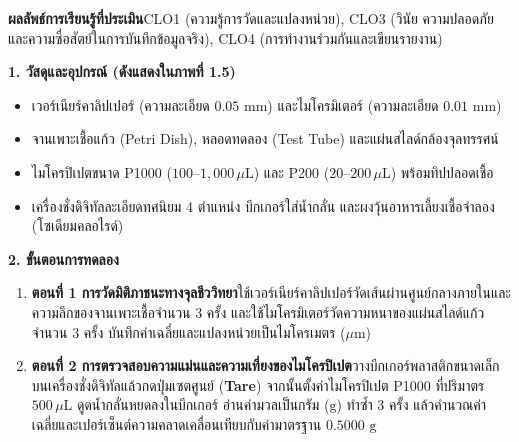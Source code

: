 \begin{labbox}
\noindent\textbf{ผลลัพธ์การเรียนรู้ที่ประเมิน}\quad CLO1 (ความรู้การวัดและแปลงหน่วย), CLO3 (วินัย ความปลอดภัย และความซื่อสัตย์ในการบันทึกข้อมูลจริง), CLO4 (การทำงานร่วมกันและเขียนรายงาน)

\vspace{4pt}
\noindent\textbf{1. วัสดุและอุปกรณ์ (ดังแสดงใน\mbox{ภาพที่} 1.5)}
\begin{itemize}
    \item เวอร์เนียร์คาลิปเปอร์ (ความละเอียด $0.05\text{ mm}$) และไมโครมิเตอร์ (ความละเอียด $0.01\text{ mm}$)
    \item จานเพาะเชื้อแก้ว (Petri Dish), หลอดทดลอง (Test Tube) และแผ่นสไลด์กล้องจุลทรรศน์
    \item ไมโครปิเปตขนาด P1000 ($100\text{--}1{,}000\,\mu\text{L}$) และ P200 ($20\text{--}200\,\mu\text{L}$) พร้อมทิปปลอดเชื้อ
    \item เครื่องชั่งดิจิทัลละเอียดทศนิยม 4 ตำแหน่ง บีกเกอร์ใส่น้ำกลั่น และผงวุ้นอาหารเลี้ยงเชื้อจำลอง (โซเดียมคลอไรด์)
\end{itemize}

\noindent\textbf{2. ขั้นตอนการทดลอง}
\begin{enumerate}
    \item \textbf{ตอนที่ 1 การวัดมิติภาชนะทางจุลชีววิทยา}\quad ใช้เวอร์เนียร์คาลิปเปอร์วัดเส้นผ่านศูนย์กลางภายในและความลึกของจานเพาะเชื้อจำนวน 3 ครั้ง และใช้ไมโครมิเตอร์วัดความหนาของแผ่นสไลด์แก้วจำนวน 3 ครั้ง บันทึกค่าเฉลี่ยและแปลงหน่วยเป็นไมโครเมตร ($\mu\text{m}$)
    \item \textbf{ตอนที่ 2 การตรวจสอบความแม่นและความเที่ยงของไมโครปิเปต}\quad วางบีกเกอร์พลาสติกขนาดเล็กบนเครื่องชั่งดิจิทัลแล้วกดปุ่มเซตศูนย์ (\textbf{Tare}) จากนั้นตั้งค่าไมโครปิเปต P1000 ที่ปริมาตร $500\,\mu\text{L}$ ดูดน้ำกลั่นหยดลงในบีกเกอร์ อ่านค่ามวลเป็นกรัม ($\text{g}$) ทำซ้ำ 3 ครั้ง แล้วคำนวณค่าเฉลี่ยและเปอร์เซ็นต์ความคลาดเคลื่อนเทียบกับค่ามาตรฐาน $0.5000\text{ g}$
\end{enumerate}


\end{labbox}
